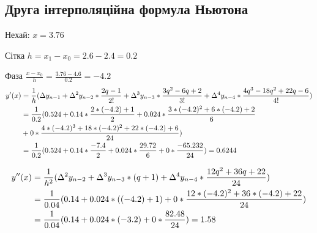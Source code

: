 \subsection{Друга інтерполяційна формула Ньютона}
\label{subsec:backward_newton}

Нехай:
$x = 3.76$

Сітка $h = x_1 - x_0 = 2.6 - 2.4 = 0.2$

Фаза $\frac{x - x_0}{h} = \frac{3.76 - 4.6}{0.2} = -4.2$
\begin{align}
    y'(x) & = \frac{1}{h}
    ( \Delta                     y_{n - 1}
    + \Delta \textsuperscript{2} y_{n - 2} * \frac{2q - 1}{2!}
    + \Delta \textsuperscript{3} y_{n - 3} * \frac{3q^2 - 6q + 2}{3!}
    + \Delta \textsuperscript{4} y_{n - 4} * \frac{4q^3 - 18q^2 + 22q - 6}{4!} )  \\
          & = \frac{1}{0.2}
    ( 0.524
    + 0.14  * \frac{2 * (-4.2) + 1}{2}
    + 0.024 * \frac{3 * (-4.2)^2 + 6 * (-4.2) + 2}{6}                             \\
          & + 0     * \frac{4 * (-4.2)^3 + 18 * (-4.2)^2 + 22 * (-4.2) + 6}{24} ) \\
          & = \frac{1}{0.2}
    ( 0.524
    + 0.14  * \frac{-7.4}{2}
    + 0.024 * \frac{29.72}{6}
    + 0     * \frac{-65.232}{24} )
    = 0.6244
\end{align}

\begin{align}
    y''(x) & = \frac{1}{h^2}
    ( \Delta \textsuperscript{2} y_{n - 2}
    + \Delta \textsuperscript{3} y_{n - 3} * (q + 1)
    + \Delta \textsuperscript{4} y_{n - 4} * \frac{12q^2 + 36q + 22}{24} ) \\
           & = \frac{1}{0.04}
    ( 0.14
    + 0.024 * ((-4.2) + 1)
    + 0     * \frac{12 * (-4.2)^2 + 36 * (-4.2) + 22}{24} )                \\
           & = \frac{1}{0.04}
    ( 0.14
    + 0.024 * (-3.2)
    + 0     * \frac{82.48}{24} )
    = 1.58
\end{align}
